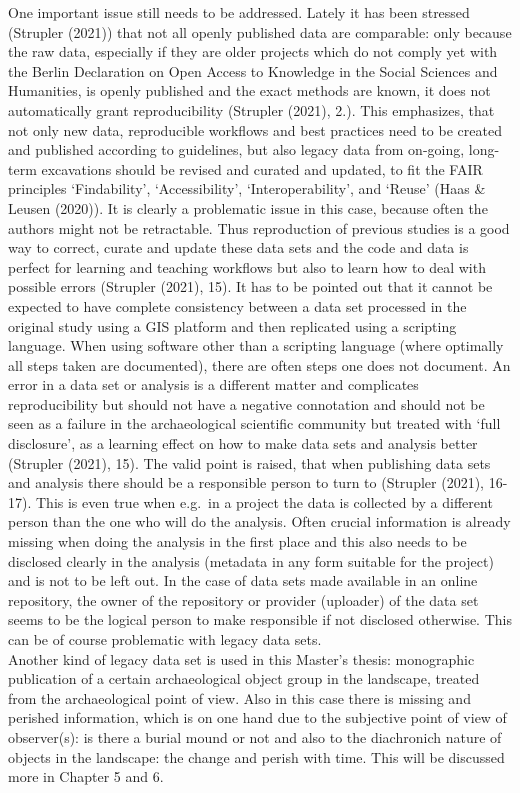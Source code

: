 \documentclass[
  12pt,
]{article}
\begin{document}
One important issue still needs to be addressed. Lately it has been stressed (Strupler (2021)) that not all openly published data are comparable: only because the raw data, especially if they are older projects which do not comply yet with the Berlin Declaration on Open Access to Knowledge in the Social Sciences and Humanities, is openly published and the exact methods are known, it does not automatically grant reproducibility (Strupler (2021), 2.). This emphasizes, that not only new data, reproducible workflows and best practices need to be created and published according to guidelines, but also legacy data from on-going, long-term excavations should be revised and curated and updated, to fit the FAIR principles `Findability', `Accessibility', `Interoperability', and `Reuse' (Haas \& Leusen (2020)). It is clearly a problematic issue in this case, because often the authors might not be retractable. Thus reproduction of previous studies is a good way to correct, curate and update these data sets and the code and data is perfect for learning and teaching workflows but also to learn how to deal with possible errors (Strupler (2021), 15). It has to be pointed out that it cannot be expected to have complete consistency between a data set processed in the original study using a GIS platform and then replicated using a scripting language. When using software other than a scripting language (where optimally all steps taken are documented), there are often steps one does not document. An error in a data set or analysis is a different matter and complicates reproducibility but should not have a negative connotation and should not be seen as a failure in the archaeological scientific community but treated with `full disclosure', as a learning effect on how to make data sets and analysis better (Strupler (2021), 15). The valid point is raised, that when publishing data sets and analysis there should be a responsible person to turn to (Strupler (2021), 16-17). This is even true when e.g.~in a project the data is collected by a different person than the one who will do the analysis. Often crucial information is already missing when doing the analysis in the first place and this also needs to be disclosed clearly in the analysis (metadata in any form suitable for the project) and is not to be left out. In the case of data sets made available in an online repository, the owner of the repository or provider (uploader) of the data set seems to be the logical person to make responsible if not disclosed otherwise. This can be of course problematic with legacy data sets.\\
Another kind of legacy data set is used in this Master's thesis: monographic publication of a certain archaeological object group in the landscape, treated from the archaeological point of view. Also in this case there is missing and perished information, which is on one hand due to the subjective point of view of observer(s): is there a burial mound or not and also to the diachronich nature of objects in the landscape: the change and perish with time. This will be discussed more in Chapter 5 and 6.
\end{document}
